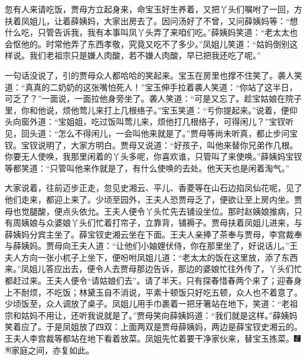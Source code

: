 忽有人来请吃饭，贾母方立起身来，命宝玉好生养着，又把丫头们嘱咐了一回，方扶着凤姐儿，让着薛姨妈，大家出房去了。因问汤好了不曾，又问薛姨妈等：``想什么吃，只管告诉我，我有本事叫凤丫头弄了来咱们吃。''薛姨妈笑道：``老太太也会怄他的。时常他弄了东西孝敬，究竟又吃不了多少。''凤姐儿笑道：``姑妈倒别这样说。我们老祖宗只是嫌人肉酸，若不嫌人肉酸，早已把我还吃了呢。''

一句话没说了，引的贾母众人都哈哈的笑起来。宝玉在房里也撑不住笑了。袭人笑道：``真真的二奶奶的这张嘴怕死人！''宝玉伸手拉着袭人笑道：``你站了这半日，可乏了？''一面说，一面拉他身旁坐了。袭人笑道：``可是又忘了。趁宝姑娘在院子里，你和他说，烦他莺儿来打上几根络子。''宝玉笑道：``亏你提起来。''说着，便仰头向窗外道：``宝姐姐，吃过饭叫莺儿来，烦他打几根络子，可得闲儿？''宝钗听见，回头道：``怎么不得闲儿，一会叫他来就是了。''贾母等尚未听真，都止步问宝钗。宝钗说明了，大家方明白。贾母又说道：``好孩子，叫他来替你兄弟作几根。你要无人使唤，我那里闲着的丫头多呢，你喜欢谁，只管叫了来使唤。''薛姨妈宝钗等都笑道：``只管叫他来作就是了，有什么使唤的去处。他天天也是闲着淘气。''

大家说着，往前迈步正走，忽见史湘云、平儿、香菱等在山石边掐凤仙花呢，见了他们走来，都迎上来了。少顷至园外，王夫人恐贾母乏了，便欲让至上房内坐。贾母也觉腿酸，便点头依允。王夫人便令丫头忙先去铺设坐位。那时赵姨娘推病，只有周姨娘与众婆娘丫头们忙着打帘子，立靠背，铺褥子。贾母扶着凤姐儿进来，与薛姨妈分宾主坐了。薛宝钗史湘云坐在下面。王夫人亲捧了茶奉与贾母，李宫裁奉与薛姨妈。贾母向王夫人道：``让他们小妯娌伏侍，你在那里坐了，好说话儿。''王夫人方向一张小杌子上坐下，便吩咐凤姐儿道：``老太太的饭在这里放，添了东西来。''凤姐儿答应出去，便令人去贾母那边告诉，那边的婆娘忙往外传了，丫头们忙都赶过来。王夫人便令``请姑娘们去''。请了半天，只有探春惜春两个来了；迎春身上不耐烦，不吃饭；林黛玉自不消说，平素十顿饭只好吃五顿，众人也不着意了。少顷饭至，众人调放了桌子。凤姐儿用手巾裹着一把牙箸站在地下，笑道：``老祖宗和姑妈不用让，还听我说就是了。''贾母笑向薛姨妈道：``我们就是这样。''薛姨妈笑着应了。于是凤姐放了四双：上面两双是贾母薛姨妈，两边是薛宝钗史湘云的。王夫人李宫裁等都站在地下看着放菜。凤姐先忙着要干净家伙来，替宝玉拣菜。{\includegraphics[width=3mm]{../Images/00006}\includegraphics[width=3mm]{../Images/00011}\footnotesize \kaishu 家庭之间，亦复如此。}


